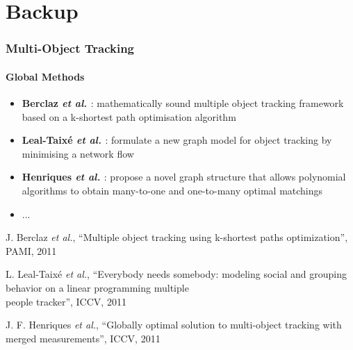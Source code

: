 \section{Backup}

\begin{frame}
	\frametitle{Multi-Object Tracking}
	\framesubtitle{Global Methods}
	
	\Large
	
	\vspace{0.05cm}
	
	\begin{itemize}
		\item \textbf{Berclaz \emph{et al.} \cite{Berclaz11}}: mathematically sound multiple object
			  tracking framework based on a k-shortest path optimisation algorithm
		\item \textbf{Leal-Taix{\'e} \emph{et al.} \cite{Leal11}}: formulate a new graph model for
			  object tracking by minimising a network flow
		\item \textbf{Henriques \emph{et al.} \cite{Henriques11}}: propose a novel graph structure
			  that allows polynomial algorithms to obtain many-to-one and one-to-many optimal matchings
		\item ...
	\end{itemize}
	
	\vspace{0.15cm}
	
	\tiny
	
	\cite{Berclaz11} J. Berclaz \emph{et al.}, ``Multiple object tracking using k-shortest paths
	optimization'', PAMI, 2011
	
	\cite{Leal11} L. Leal-Taix{\'e} \emph{et al.}, ``Everybody needs somebody: modeling social and
	grouping behavior on a linear programming multiple\\ \hspace{0.25cm} people tracker'', ICCV, 2011
	
	\cite{Henriques11} J. F. Henriques \emph{et al.}, ``Globally optimal solution to multi-object
	tracking with merged measurements'', ICCV, 2011\\
\end{frame}

